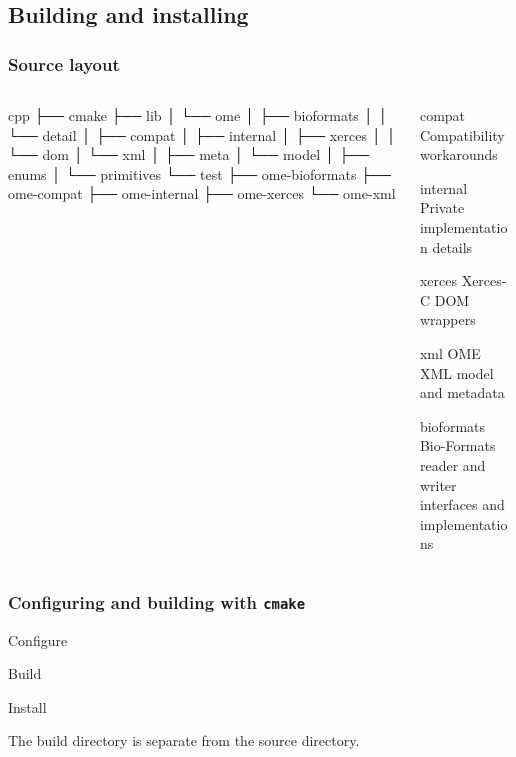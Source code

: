 \documentclass{beamer}
\begin{document}
\subsection{Building and installing}

\begin{frame}[fragile]
  \frametitle{Source layout}
  \begin{columns}
    \begin{column}{.5\linewidth}
      \begin{semiverbatim}\tiny
cpp
├── cmake
├── lib
│   └── ome
│       ├── bioformats
│       │   └── detail
│       ├── compat
│       ├── internal
│       ├── xerces
│       │   └── dom
│       └── xml
│           ├── meta
│           └── model
│               ├── enums
│               └── primitives
└── test
    ├── ome-bioformats
    ├── ome-compat
    ├── ome-internal
    ├── ome-xerces
    └── ome-xml
\end{semiverbatim}
      \end{column}
    \begin{column}{.5\linewidth}
      \begin{block}{compat}
        Compatibility workarounds
      \end{block}
      \begin{block}{internal}
        Private implementation details
      \end{block}
      \begin{block}{xerces}
        Xerces-C DOM wrappers
      \end{block}
      \begin{block}{xml}
        OME XML model and metadata
      \end{block}
      \begin{block}{bioformats}
        Bio-Formats reader and writer interfaces and implementations
      \end{block}
    \end{column}
  \end{columns}
\end{frame}

\begin{frame}[fragile]
  \frametitle{Configuring and building with \texttt{cmake}}
\begin{block}{Configure}
  \begin{semiverbatim}\footnotesize
\end{semiverbatim}
\end{block}
\begin{block}{Build}
  \begin{semiverbatim}\footnotesize
\end{semiverbatim}
\end{block}
\begin{block}{Install}
  \begin{semiverbatim}\footnotesize
\end{semiverbatim}
\end{block}
The build directory is separate from the source directory.
\end{frame}
\end{document}
